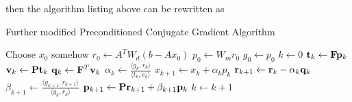 then the algorithm listing above can be rewritten as
\begin{algorithm}[H]
\caption{Further modified Preconditioned Conjugate Gradient Algorithm}
\begin{algorithmic}[1]
\State Choose $x_0$ somehow
  \State $r_0 \gets A^TW_d(b-Ax_0)$
  \State $p_0 \gets W_mr_0$
  \State $g_0 \gets p_0$
  \State $k \gets 0$
  \Repeat
  \State ${\bf t}_k \gets {\bf F}{\bf p}_k$
  \State ${\bf v}_k \gets {\bf P}{\bf t}_k$
  \State ${\bf q}_k \gets {\bf F}^T{\bf v}_k$
  \State $\alpha_k \gets \frac{\langle g_k,r_k \rangle}{\langle t_k,v_k\rangle}$
  \State $x_{k+1} \gets x_k + \alpha_k p_k$
  \State ${\bf r}_{k+1} \gets {\bf r}_k - \alpha_k{\bf q}_k$
  \State $\beta_{k+1} \gets \frac{\langle g_{k+1},r_{k+1}\rangle}{\langle g_k,r_k\rangle}$
  \State ${\bf p}_{k+1}\gets {\bf P}{\bf r}_{k+1}+\beta_{k+1}{\bf p}_k$
  \State $k \gets k+1$
\end{algorithmic}
\end{algorithm}

